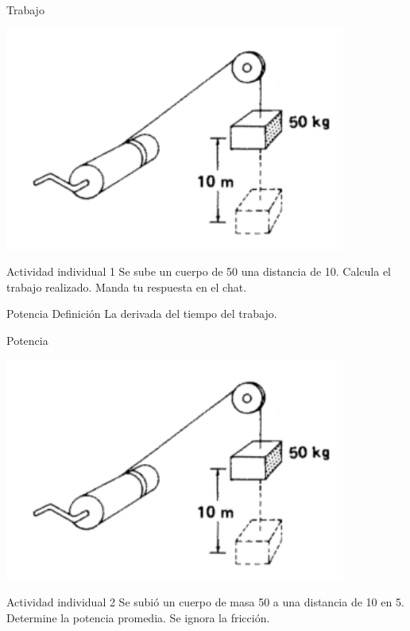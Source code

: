 \documentclass[presentation,aspectratio=169]{beamer}
\begin{document}
\begin{frame}[label={sec:org6572bb4}]{Trabajo}
\begin{center}
\includegraphics[height=0.6\textheight]{../../figures/pulley-block-50kg.png}
\end{center}

\alert{Actividad individual 1} Se sube un cuerpo de \unit{50}{\kilogram} una distancia de \unit{10}{\meter}. Calcula el trabajo realizado. Manda tu respuesta en el chat.
\end{frame}



\begin{frame}[label={sec:org585b1c9}]{Potencia}
\alert{Definición} La derivada del tiempo del trabajo.
\end{frame}

\begin{frame}[label={sec:org21f0b99}]{Potencia}
\begin{center}
\includegraphics[height=0.6\textheight]{../../figures/pulley-block-50kg.png}
\end{center}

\alert{Actividad individual 2} Se subió un cuerpo de masa \unit{50}{\kilogram}  a una distancia de \unit{10}{\meter} en \unit{5}{\second}. Determine la potencia promedia. Se ignora la fricción.
\end{frame}
\end{document}
